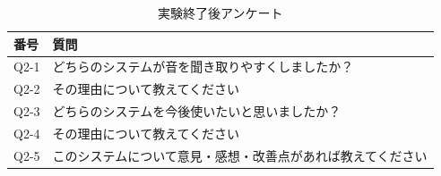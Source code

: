 \begin{table}[H]\centering 
    \caption{実験終了後アンケート}\label{tab:que2}
    \begin{tabular}{ll} \hline
    番号 & 質問\\ \hline
    Q2-1 & どちらのシステムが音を聞き取りやすくしましたか？ \\
    Q2-2 & その理由について教えてください \\
    Q2-3 & どちらのシステムを今後使いたいと思いましたか？ \\
    Q2-4 & その理由について教えてください \\
    Q2-5 & このシステムについて意見・感想・改善点があれば教えてください \\ \hline
    \end{tabular}
\end{table}


